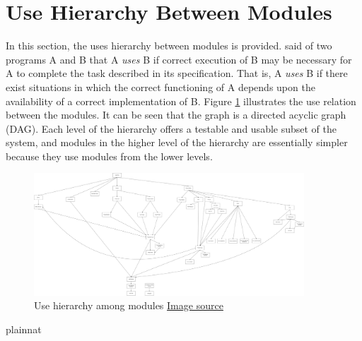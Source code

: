 \documentclass[12pt, titlepage]{article}
\begin{document}
\section{Use Hierarchy Between Modules} \label{SecUse}

In this section, the uses hierarchy between modules is
provided. \citet{Parnas1978} said of two programs A and B that A {\em uses} B if
correct execution of B may be necessary for A to complete the task described in
its specification. That is, A {\em uses} B if there exist situations in which
the correct functioning of A depends upon the availability of a correct
implementation of B.  Figure \ref{FigUH} illustrates the use relation between
the modules. It can be seen that the graph is a directed acyclic graph
(DAG). Each level of the hierarchy offers a testable and usable subset of the
system, and modules in the higher level of the hierarchy are essentially simpler
because they use modules from the lower levels.

\begin{figure}[H]
	\centering
	\includegraphics[width=0.9\textwidth]{usecase.png}
	\caption{Use hierarchy among modules \href{usecase.png}{Image source}}
	\label{FigUH}
\end{figure}


 {plainnat}

\end{document}
